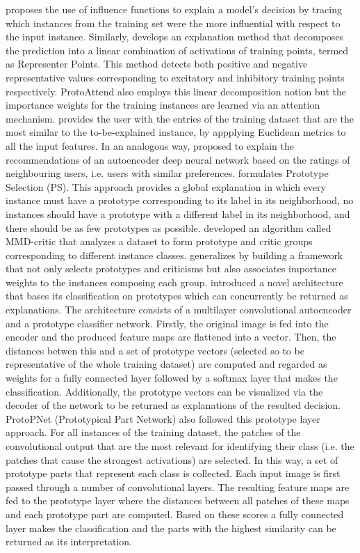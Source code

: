 \documentclass[journal]{IEEEtran}
\begin{document}
\cite{Wei2017} proposes the use of influence functions to explain a model’s decision by tracing which instances from the training set were the more influential with respect to the input instance.
Similarly, \cite{Yeh2018} develops an explanation method that decomposes the prediction into a linear combination of activations of training points, termed as Representer Points. This method detects both positive and negative representative values corresponding to excitatory and inhibitory training points respectively.
ProtoAttend \cite{Arik2020} also employs this linear decomposition notion but the importance weights for the training instances are learned via an attention mechanism.
\cite{Caruana1999} provides the user with the entries of the training dataset that are the most similar to the to-be-explained instance, by appplying Euclidean metrics to all the input features.
In an analogous way, \cite{Haghighi2019} proposed to explain the recommendations of an autoencoder deep neural network based on the ratings of neighbouring users, i.e. users with similar preferences. 
\cite{Bien2011} formulates Prototype Selection (PS). This approach provides a global explanation in which every instance must have a prototype corresponding to its label in its neighborhood, no instances should have a prototype with a different label in its neighborhood, and there should be as few prototypes as possible.  
\cite{Kim2016} developed an algorithm called MMD-critic that analyzes a dataset to form prototype and critic groups corresponding to different instance classes.
\cite{Gurumoorthy2019} generalizes \cite{Kim2016} by building a framework that not only selects prototypes and criticisms but also associates importance weights to the instances composing each group. 
\cite{Li2018} introduced a novel architecture that bases its classification on prototypes which can concurrently be returned as explanations. The architecture consists of a multilayer convolutional autoencoder and a prototype classifier network. Firstly, the original image is fed into the encoder and the produced feature maps are flattened into a vector. Then, the distances betwen this and a set of prototype vectors (selected so to be representative of the whole training dataset) are computed and regarded as weights for a fully connected layer followed by a softmax layer that makes the classification. Additionally, the prototype vectors can be visualized via the decoder of the network to be returned as explanations of the resulted decision.
ProtoPNet (Prototypical Part Network) \cite{Chen2019} also followed this prototype layer approach. For all instances of the training dataset, the patches of the convolutional output that are the most relevant for identifying their class (i.e. the patches that cause the strongest activations) are selected. In this way, a set of prototype parts that represent each class is collected. Each input image is first passed through a number of convolutional layers. The resulting feature maps are fed to the prototype layer where the distances between all patches of these maps and each prototype part are computed. Based on these scores a fully connected layer makes the classification and the parts with the highest similarity can be returned as its interpretation.
\end{document}
